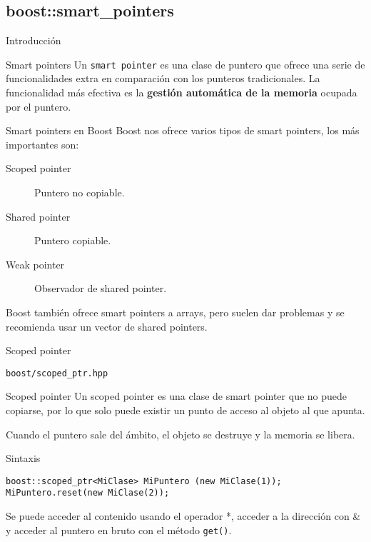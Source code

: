 \documentclass[8pt,xcolor=svgnames]{beamer}
\begin{document}
\subsection{boost::smart\_pointers}

\begin{frame}{Introducción}
  \begin{block}{Smart pointers}
    Un \texttt{smart pointer} es una clase de puntero que ofrece una
    serie de funcionalidades extra en comparación con los punteros
    tradicionales. La funcionalidad más efectiva es la \textbf{gestión
    automática de la memoria} ocupada por el puntero.
  \end{block}
  \pause
  \begin{block}{Smart pointers en Boost}
    Boost nos ofrece varios tipos de smart pointers, los más importantes son:
    \begin{description}
    \item[Scoped pointer] Puntero no copiable.
    \item[Shared pointer] Puntero copiable.
    \item[Weak pointer] Observador de shared pointer.
    \end{description}
    Boost también ofrece smart pointers a arrays, pero suelen dar
    problemas y se recomienda usar un vector de shared pointers.
  \end{block}
\end{frame}

\begin{frame}[fragile]{Scoped pointer}
  \begin{block}{}
    \texttt{boost/scoped\_ptr.hpp}
  \end{block}
  
  \begin{block}{Scoped pointer}
    Un scoped pointer es una clase de smart pointer que no puede
    copiarse, por lo que solo puede existir un punto de acceso al
    objeto al que apunta.

    \medskip

    Cuando el puntero sale del ámbito, el objeto se destruye y la memoria se libera.
  \end{block}
  \pause
  \begin{block}{Sintaxis}
\begin{verbatim}
boost::scoped_ptr<MiClase> MiPuntero (new MiClase(1));
MiPuntero.reset(new MiClase(2));
\end{verbatim}
    Se puede acceder al contenido usando el operador *, acceder a la
    dirección con \& y acceder al puntero en bruto con el método \texttt{get()}.
  \end{block}
\end{frame}
\end{document}
